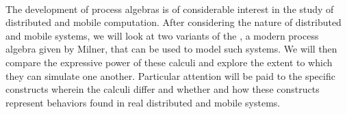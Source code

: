 \cleardoublepage
{
\thispagestyle{empty}
\begin{center}
\null\vfil
{}\\[24pt]
The development of process algebras is of considerable interest in the study of distributed and mobile computation.  After considering the nature of distributed and mobile systems, we will look at two variants of the \picalc, a modern process algebra given by Milner, that can be used to model such systems.  We will then compare the expressive power of these calculi and explore the extent to which they can simulate one another.  Particular attention will be paid to the specific constructs wherein the calculi differ and whether and how these constructs represent behaviors found in real distributed and mobile systems.  \end{center}
\vspace{10cm}
\cleardoublepage
}